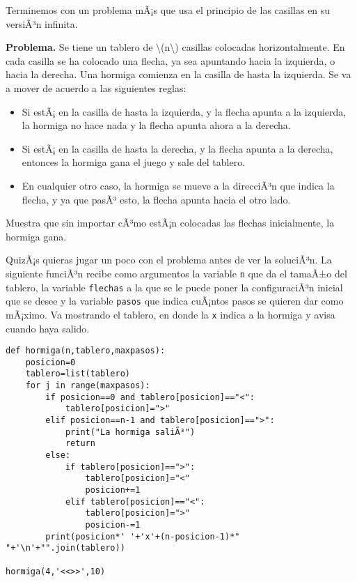 \documentclass[
]{article}
\begin{document}
Terminemos con un problema mÃ¡s que usa el principio de las casillas en
su versiÃ³n infinita.

\textbf{Problema.} Se tiene un tablero de
{\textbackslash(n\textbackslash)} casillas colocadas horizontalmente. En
cada casilla se ha colocado una flecha, ya sea apuntando hacia la
izquierda, o hacia la derecha. Una hormiga comienza en la casilla de
hasta la izquierda. Se va a mover de acuerdo a las siguientes reglas:

\begin{itemize}
\item
  Si estÃ¡ en la casilla de hasta la izquierda, y la flecha apunta a la
  izquierda, la hormiga no hace nada y la flecha apunta ahora a la
  derecha.
\item
  Si estÃ¡ en la casilla de hasta la derecha, y la flecha apunta a la
  derecha, entonces la hormiga gana el juego y sale del tablero.
\item
  En cualquier otro caso, la hormiga se mueve a la direcciÃ³n que indica
  la flecha, y ya que pasÃ³ esto, la flecha apunta hacia el otro lado.
\end{itemize}

Muestra que sin importar cÃ³mo estÃ¡n colocadas las flechas
inicialmente, la hormiga gana.

QuizÃ¡s quieras jugar un poco con el problema antes de ver la soluciÃ³n.
La siguiente funciÃ³n recibe como argumentos la variable {\texttt{n}}
que da el tamaÃ±o del tablero, la variable {\texttt{flechas}} a la que
se le puede poner la configuraciÃ³n inicial que se desee y la variable
{\texttt{pasos}} que indica cuÃ¡ntos pasos se quieren dar como mÃ¡ximo.
Va mostrando el tablero, en donde la {\texttt{x}} indica a la hormiga y
avisa cuando haya salido.

\begin{verbatim}
def hormiga(n,tablero,maxpasos):
    posicion=0
    tablero=list(tablero)
    for j in range(maxpasos):
        if posicion==0 and tablero[posicion]=="<":
            tablero[posicion]=">"
        elif posicion==n-1 and tablero[posicion]==">":
            print("La hormiga saliÃ³")
            return
        else:
            if tablero[posicion]==">":
                tablero[posicion]="<"
                posicion+=1
            elif tablero[posicion]=="<":
                tablero[posicion]=">"
                posicion-=1
        print(posicion*' '+'x'+(n-posicion-1)*" "+'\n'+"".join(tablero))

hormiga(4,'<<>>',10)
\end{verbatim}
\end{document}
